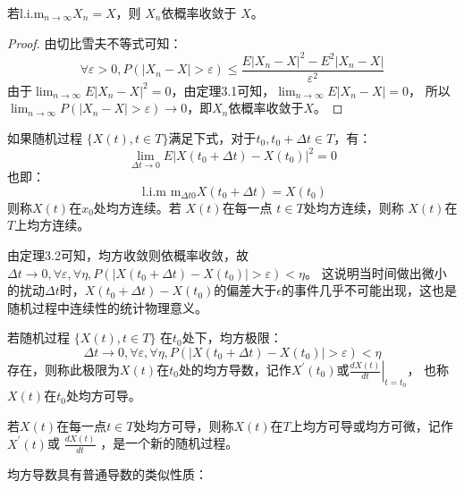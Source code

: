 \documentclass[lang=cn,newtx,10pt,scheme=chinese]{elegantbook}
\begin{document}
\begin{theorem}
  若$\mathrm{l.i.m}_{n \rightarrow \infty} X_n=X$，则 $X_n$依概率收敛于 $X$。
\end{theorem}

\begin{proof}
  由切比雪夫不等式可知：
  $$
  \forall \varepsilon>0, P\left(\left|X_n-X\right|>\varepsilon\right) \leq \frac{E\left|X_n-X\right|^2-E^2\left|X_n-X\right|}{\varepsilon^2}
  $$
  由于$\lim _{n \rightarrow \infty} E\left|X_n-X\right|^2=0$，由定理3.1可知，$\lim _{n \rightarrow \infty} E\left|X_n-X\right|=0$，
  所以$\lim _{n \rightarrow \infty} P\left(\left|X_n-X\right|>\varepsilon\right) \rightarrow 0$，即$X_n$依概率收敛于$X$。
\end{proof}

\begin{definition}
  如果随机过程 $\{X(t), t\in T\}$满足下式，对于$t_0, t_0 + \Delta t \in T $，有：
  $$
\lim _{\Delta t \rightarrow 0} E\left|X\left(t_0+\Delta t\right)-X\left(t_0\right)\right|^2=0
$$
也即：
$$
\text { l.i.m } \mathrm{m}_{\Delta t 0} X\left(t_0+\Delta t\right)=X\left(t_0\right)
$$
则称$X(t)$在$x_0$处均方连续。若 $X(t)$在每一点 $t \in T$处均方连续，则称 $X(t)$在$T$上均方连续。
\end{definition}
由定理3.2可知，均方收敛则依概率收敛，故$\Delta t \rightarrow 0, \forall \varepsilon, \forall \eta, P\left(\left|X\left(t_0+\Delta t\right)-X\left(t_0\right)\right|>\varepsilon\right)<\eta$。
这说明当时间做出微小的扰动$\Delta t$时，$X(t_0 + \Delta t) - X(t_0)$的偏差大于$\epsilon$的事件几乎不可能出现，这也是随机过程中连续性的统计物理意义。

\begin{definition}
  若随机过程 $\{ X(t), t \in T \}$ 在$t_0$处下，均方极限：
  \begin{equation}
    \Delta t \rightarrow 0, \forall \varepsilon, \forall \eta, P\left(\left|X\left(t_0+\Delta t\right)-X\left(t_0\right)\right|>\varepsilon\right)<\eta
    \end{equation}
  存在，则称此极限为$X(t)$在$t_0$处的均方导数，记作$X^{\prime}(t_0)$或$\left.\frac{d X(t)}{d t}\right|_{t=t_0}$，
  也称$X(t)$在$t_0$处均方可导。

  若$X(t)$在每一点$t \in T$处均方可导，则称$X(t)$在$T$上均方可导或均方可微，记作$X^{\prime}(t)$或
  $\frac{d X(t)}{d t}$ ，是一个新的随机过程。
\end{definition}

均方导数具有普通导数的类似性质：
\end{document}
